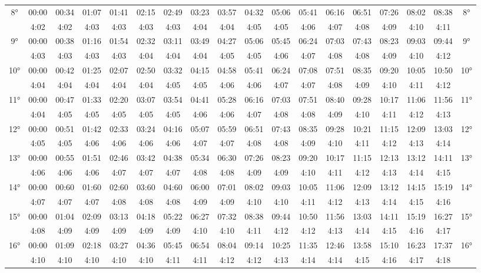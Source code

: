 \begin{scriptsize}
\begin{tabular}{c || c | c | c | c | c | c | c | c | c | c | c | c | c | c | c | c || c}
		\multirow{2}{*}{8°}&00:00&00:34&01:07&01:41&02:15&02:49&03:23&03:57&04:32&05:06&05:41&06:16&06:51&07:26&08:02&08:38&\multirow{2}{*}{8°}\\ \space&4:02&4:02&4:03&4:03&4:03&4:03&4:04&4:04&4:05&4:05&4:06&4:07&4:08&4:09&4:10&4:11&\space\\\hline
		\multirow{2}{*}{9°}&00:00&00:38&01:16&01:54&02:32&03:11&03:49&04:27&05:06&05:45&06:24&07:03&07:43&08:23&09:03&09:44&\multirow{2}{*}{9°}\\ \space&4:03&4:03&4:03&4:03&4:04&4:04&4:04&4:05&4:05&4:06&4:07&4:08&4:08&4:09&4:10&4:12&\space\\\hline
		\multirow{2}{*}{10°}&00:00&00:42&01:25&02:07&02:50&03:32&04:15&04:58&05:41&06:24&07:08&07:51&08:35&09:20&10:05&10:50&\multirow{2}{*}{10°}\\ \space&4:04&4:04&4:04&4:04&4:04&4:05&4:05&4:06&4:06&4:07&4:07&4:08&4:09&4:10&4:11&4:12&\space\\\hline
		\multirow{2}{*}{11°}&00:00&00:47&01:33&02:20&03:07&03:54&04:41&05:28&06:16&07:03&07:51&08:40&09:28&10:17&11:06&11:56&\multirow{2}{*}{11°}\\ \space&4:04&4:05&4:05&4:05&4:05&4:05&4:06&4:06&4:07&4:08&4:08&4:09&4:10&4:11&4:12&4:13&\space\\\hline
		\multirow{2}{*}{12°}&00:00&00:51&01:42&02:33&03:24&04:16&05:07&05:59&06:51&07:43&08:35&09:28&10:21&11:15&12:09&13:03&\multirow{2}{*}{12°}\\ \space&4:05&4:05&4:06&4:06&4:06&4:06&4:07&4:07&4:08&4:08&4:09&4:10&4:11&4:12&4:13&4:14&\space\\\hline
		\multirow{2}{*}{13°}&00:00&00:55&01:51&02:46&03:42&04:38&05:34&06:30&07:26&08:23&09:20&10:17&11:15&12:13&13:12&14:11&\multirow{2}{*}{13°}\\ \space&4:06&4:06&4:06&4:07&4:07&4:07&4:08&4:08&4:09&4:09&4:10&4:11&4:12&4:13&4:14&4:15&\space\\\hline
		\multirow{2}{*}{14°}&00:00&00:60&01:60&02:60&03:60&04:60&06:00&07:01&08:02&09:03&10:05&11:06&12:09&13:12&14:15&15:19&\multirow{2}{*}{14°}\\ \space&4:07&4:07&4:07&4:08&4:08&4:08&4:09&4:09&4:10&4:10&4:11&4:12&4:13&4:14&4:15&4:16&\space\\\hline
		\multirow{2}{*}{15°}&00:00&01:04&02:09&03:13&04:18&05:22&06:27&07:32&08:38&09:44&10:50&11:56&13:03&14:11&15:19&16:27&\multirow{2}{*}{15°}\\ \space&4:08&4:09&4:09&4:09&4:09&4:09&4:10&4:10&4:11&4:12&4:12&4:13&4:14&4:15&4:16&4:17&\space\\\hline
		\multirow{2}{*}{16°}&00:00&01:09&02:18&03:27&04:36&05:45&06:54&08:04&09:14&10:25&11:35&12:46&13:58&15:10&16:23&17:37&\multirow{2}{*}{16°}\\ \space&4:10&4:10&4:10&4:10&4:10&4:11&4:11&4:12&4:12&4:13&4:14&4:14&4:15&4:16&4:17&4:18&\space\\\hline

\end{tabular}
\end{scriptsize}
